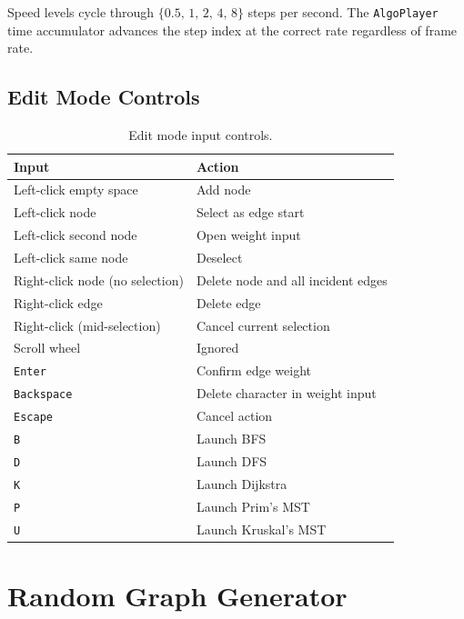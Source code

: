 \documentclass[12pt, a4paper]{article}
\begin{document}
Speed levels cycle through $\{0.5,\,1,\,2,\,4,\,8\}$ steps per second.
The \texttt{AlgoPlayer} time accumulator advances the step index at the
correct rate regardless of frame rate.

\subsection{Edit Mode Controls}

\begin{table}[H]
\centering
\caption{Edit mode input controls.}
\begin{tabular}{@{}ll@{}}
\toprule
\textbf{Input} & \textbf{Action} \\
\midrule
Left-click empty space          & Add node \\
Left-click node                 & Select as edge start \\
Left-click second node          & Open weight input \\
Left-click same node            & Deselect \\
Right-click node (no selection) & Delete node and all incident edges \\
Right-click edge                & Delete edge \\
Right-click (mid-selection)     & Cancel current selection \\
Scroll wheel                    & Ignored \\
\texttt{Enter}                  & Confirm edge weight \\
\texttt{Backspace}              & Delete character in weight input \\
\texttt{Escape}                 & Cancel action \\
\texttt{B}                      & Launch BFS \\
\texttt{D}                      & Launch DFS \\
\texttt{K}                      & Launch Dijkstra \\
\texttt{P}                      & Launch Prim's MST \\
\texttt{U}                      & Launch Kruskal's MST \\
\bottomrule
\end{tabular}
\end{table}

\section{Random Graph Generator}
\label{sec:generator}
\end{document}
